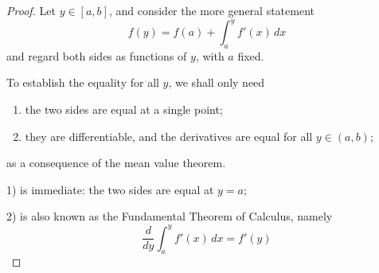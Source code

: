 

\begin{proof}

Let $y\in [a,b]$, and consider the more general statement
$$
f(y) = f(a) + \int_a^y f'(x)\,dx 
$$
and regard both sides as functions of $y$, with $a$ fixed.

To establish the equality for all $y$, we shall only need
\begin{enumerate}
\item the two sides are equal at a single point;
\item they are differentiable, and the derivatives are equal 
for all $y\in (a,b)$;
\end{enumerate}
as a consequence of the mean value theorem.

1) is immediate: the two sides are equal at $y=a$;

2) is also known as the Fundamental Theorem of Calculus, namely
$$
\frac{d}{dy}\int_a^y f'(x)\,dx = f'(y)
$$

\end{proof}


